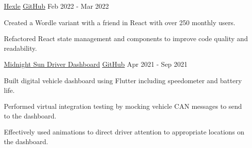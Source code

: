 

\begin{cventries}

  \cventry
    {\href{https://frankljin.github.io/hexle/}{\underline{Hexle}}} %
    {\href{https://github.com/frankljin/hexle/}{\underline{GitHub}} \faGithubSquare} %
    {} %
    {Feb 2022 - Mar 2022} %
    {
      \begin{cvitems} %
        \item {Created a Wordle variant with a friend in {React} with over 250 monthly users.}
        \item {Refactored React state management and components to improve code quality and readability.}
      \end{cvitems}
    }

  \cventry
    {\href{https://tinyurl.com/daniel-qu-portfolio}{Midnight Sun Driver Dashboard}} %
    {\href{https://github.com/uw-midsun/telemetry_xiv}{\underline{GitHub}} \faGithubSquare}
    {}
    {Apr 2021 - Sep 2021} %
    {
      \begin{cvitems} %
        \item {Built digital vehicle dashboard using {Flutter} including speedometer and battery life.}
        \item {Performed virtual {integration testing} by mocking vehicle CAN messages to send to the dashboard.}
        \item {Effectively used animations to direct driver attention to appropriate locations on the dashboard.}
      \end{cvitems}
    }



\end{cventries}
